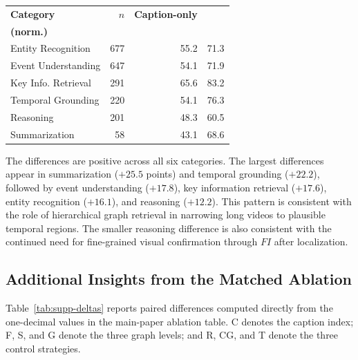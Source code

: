 \documentclass[11pt]{article}
\begin{document}
\begin{center}
  \centering
  \small
  \setlength{\tabcolsep}{3pt}
  \begin{tabular}{@{}lrrr@{}}
    \toprule
    \textbf{Category} &
    \textbf{$n$} &
    \textbf{Caption-only} &
    \shortstack{\textbf{SGDAgent}\\\textbf{(norm.)}} \\
    \midrule
    Entity Recognition & 677 & 55.2 & 71.3 \\
    Event Understanding & 647 & 54.1 & 71.9 \\
    Key Info. Retrieval & 291 & 65.6 & 83.2 \\
    Temporal Grounding & 220 & 54.1 & 76.3 \\
    Reasoning & 201 & 48.3 & 60.5 \\
    Summarization & 58 & 43.1 & 68.6 \\
    \bottomrule
  \end{tabular}
  \label{tab:supp-category}
\end{center}

The differences are positive across all six categories.
The largest differences appear in summarization ($+25.5$ points) and temporal grounding ($+22.2$), followed by event understanding ($+17.8$), key information retrieval ($+17.6$), entity recognition ($+16.1$), and reasoning ($+12.2$).
This pattern is consistent with the role of hierarchical graph retrieval in narrowing long videos to plausible temporal regions.
The smaller reasoning difference is also consistent with the continued need for fine-grained visual confirmation through $FI$ after localization.

\subsection{Additional Insights from the Matched Ablation}

Table~\ref{tab:supp-deltas} reports paired differences computed directly from the one-decimal values in the main-paper ablation table.
C denotes the caption index; F, S, and G denote the three graph levels; and R, CG, and T denote the three control strategies.
\end{document}
